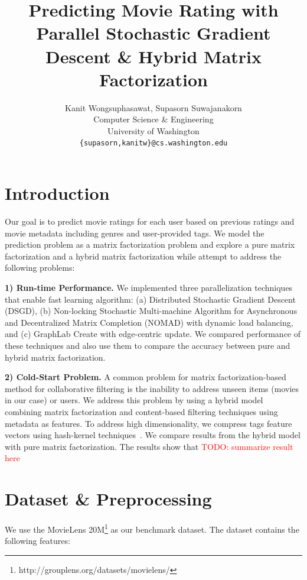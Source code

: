 \documentclass{article} %
\title{Predicting Movie Rating with Parallel Stochastic Gradient Descent \& Hybrid Matrix Factorization}
\author{
Kanit Wongsuphasawat, Supasorn Suwajanakorn \\
Computer Science \& Engineering\\
University of Washington\\
\texttt{\{supasorn,kanitw\}@cs.washington.edu} \\
}
\newcommand{\todo}[1]{\textcolor{red}{TODO: #1}}
\begin{document}
\maketitle

\section{Introduction}

Our goal is to predict movie ratings for each user based on previous ratings
and movie metadata including genres and user-provided tags. We model the
prediction problem as a matrix factorization problem and explore a pure matrix
factorization and a hybrid matrix factorization while attempt to address the
following problems:

\textbf{1) Run-time Performance.}
We implemented three parallelization techniques that enable fast
learning algorithm:
(a) Distributed Stochastic Gradient Descent (DSGD),
(b) Non-locking Stochastic Multi-machine Algorithm for Asynchronous and Decentralized Matrix Completion (NOMAD) with dynamic load balancing, and
(c) GraphLab Create with edge-centric update.
We compared performance of these techniques and also use them to compare the accuracy between pure and hybrid matrix factorization.


\textbf{2) Cold-Start Problem.}
A common problem for matrix factorization-based method for collaborative
filtering is the inability to address unseen items (movies in our case) or
users.  We address this problem by using a hybrid model combining matrix
factorization and content-based filtering techniques using metadata as
features. To address high dimensionality, we compress tags feature vectors
using hash-kernel techniques~\cite{shi:hashkernels}.  We compare results
from the hybrid model with pure matrix factorization.  The results show that \todo{summarize result here}


\section{Dataset \& Preprocessing}

We use the MovieLens 20M\footnote{http://grouplens.org/datasets/movielens/}
as our benchmark dataset.  The dataset contains the following features:
\end{document}
